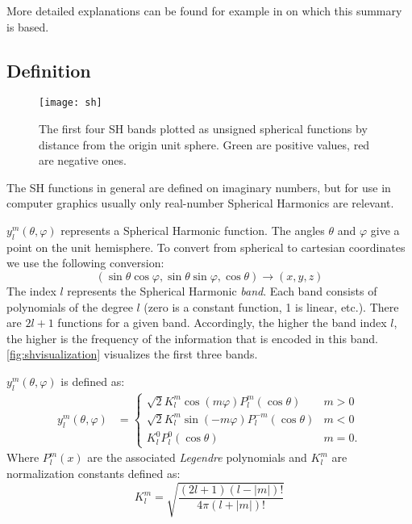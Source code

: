 \documentclass[thesis.tex]{subfiles}
\begin{document}
More detailed explanations can be found for example in \cite{bib:grittysh, bib:stupidsh} on which this summary is based.

\subsection{Definition} \label{chap:sh:def}
\begin{figure}[h]
	\centering
	\texttt{[image: sh]}
	\caption{\cite{bib:guerrero:thesis} The first four SH bands plotted as unsigned spherical functions by distance from the origin unit sphere. Green are positive values, red are negative ones.}
	\label{fig:shvisualization}
\end{figure}
The SH functions in general are defined on imaginary numbers, but for use in computer graphics usually only real-number Spherical Harmonics are relevant.

$y^m_l(\theta, \varphi)$ represents a Spherical Harmonic function.
The angles $\theta$ and $\varphi$ give a point on the unit hemisphere.
To convert from spherical to cartesian coordinates we use the following conversion:
\begin{equation} \label{equ:postoangle}
(\sin\theta\cos\varphi, \sin\theta\sin\varphi, \cos\theta) \rightarrow (x,y,z)
\end{equation}
The index $l$ represents the Spherical Harmonic \emph{band}.
Each band consists of polynomials of the degree $l$ (zero is a constant function, 1 is linear, etc.).
There are $2l+1$ functions for a given band.
Accordingly, the higher the band index $l$, the higher is the frequency of the information that is encoded in this band.
\autoref{fig:shvisualization} visualizes the first three bands.

$y^m_l(\theta, \varphi)$ is defined as:
\begin{equation}
	\begin{alignedat}{2}
		y^m_l(\theta, \varphi) &= \begin{cases}
		\sqrt{2}K^m_l \cos(m\varphi) P^m_l(\cos\theta) & m>0\\
		\sqrt{2}K^m_l \sin(-m\varphi) P^{-m}_l(\cos\theta) & m<0\\
		K^0_l P^0_l(\cos\theta) & m=0.\end{cases}
	\end{alignedat}
\end{equation}
Where $P^m_l(x)$ are the associated \emph{Legendre} polynomials and $K^m_l$ are normalization constants defined as:
\begin{equation}
	K^m_l = \sqrt{\frac{(2l+1)(l-|m|)!}{4\pi(l+|m|)!}}
\end{equation}
\end{document}
